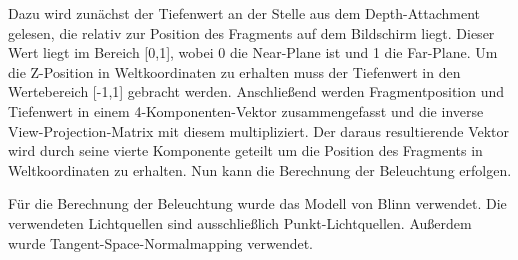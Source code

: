 Dazu wird zunächst der Tiefenwert an der Stelle aus dem Depth-Attachment gelesen, die relativ zur Position des Fragments auf dem Bildschirm liegt. Dieser Wert liegt im Bereich [0,1], wobei 0 die Near-Plane ist und 1 die Far-Plane. Um die Z-Position in Weltkoordinaten zu erhalten muss der Tiefenwert in den Wertebereich [-1,1] gebracht werden.
Anschließend werden Fragmentposition und Tiefenwert in einem 4-Komponenten-Vektor zusammengefasst und die inverse View-Projection-Matrix mit diesem multipliziert. Der daraus resultierende Vektor wird durch seine vierte Komponente geteilt um die Position des Fragments in Weltkoordinaten zu erhalten. Nun kann die Berechnung der Beleuchtung erfolgen.

Für die Berechnung der Beleuchtung wurde das Modell von Blinn verwendet. Die verwendeten Lichtquellen sind ausschließlich Punkt-Lichtquellen. Außerdem wurde Tangent-Space-Normalmapping verwendet.